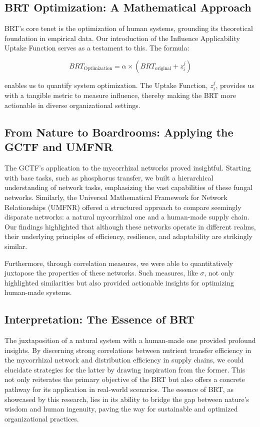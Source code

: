 \documentclass[sn-nature]{sn-jnl}%
\theoremstyle{thmstyleone}%
\theoremstyle{thmstyletwo}%
\theoremstyle{thmstylethree}%
\begin{document}
\subsection{BRT Optimization: A Mathematical Approach}

BRT's core tenet is the optimization of human systems, grounding its theoretical foundation in empirical data. Our introduction of the Influence Applicability Uptake Function serves as a testament to this. The formula:

\begin{equation}
BRT_{\text{Optimization}} = \alpha \times (BRT_{\text{original}} + z_i^j)
\end{equation}

enables us to quantify system optimization. The Uptake Function, \( z_i^j \), provides us with a tangible metric to measure influence, thereby making the BRT more actionable in diverse organizational settings.

\subsection{From Nature to Boardrooms: Applying the GCTF and UMFNR}

The GCTF's application to the mycorrhizal networks proved insightful. Starting with base tasks, such as phosphorus transfer, we built a hierarchical understanding of network tasks, emphasizing the vast capabilities of these fungal networks\cite{whiteside_data_2019}. Similarly, the Universal Mathematical Framework for Network Relationships (UMFNR) offered a structured approach to compare seemingly disparate networks: a natural mycorrhizal one and a human-made supply chain. Our findings highlighted that although these networks operate in different realms, their underlying principles of efficiency, resilience, and adaptability are strikingly similar.

Furthermore, through correlation measures, we were able to quantitatively juxtapose the properties of these networks. Such measures, like \( \sigma \), not only highlighted similarities but also provided actionable insights for optimizing human-made systems.

\subsection{Interpretation: The Essence of BRT}

The juxtaposition of a natural system with a human-made one provided profound insights. By discerning strong correlations between nutrient transfer efficiency in the mycorrhizal network and distribution efficiency in supply chains, we could elucidate strategies for the latter by drawing inspiration from the former. This not only reiterates the primary objective of the BRT but also offers a concrete pathway for its application in real-world scenarios. The essence of BRT, as showcased by this research, lies in its ability to bridge the gap between nature's wisdom and human ingenuity, paving the way for sustainable and optimized organizational practices.
\end{document}
